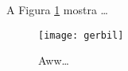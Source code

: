 \documentclass{article}
\begin{document}
A Figura \ref{fig:gerbil} mostra \ldots

\begin{figure}
  \centering
  \texttt{[image: gerbil]}
  \caption{Aww\ldots}
  \label{fig:gerbil}
\end{figure}
\end{document}
